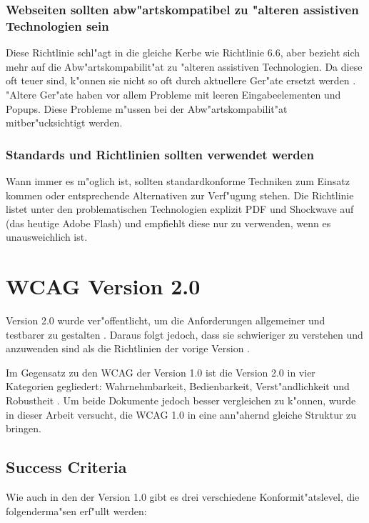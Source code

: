\documentclass[a4paper,bibtotoc,oneside]{scrbook}
\begin{document}
\subsubsection{Webseiten sollten abw"artskompatibel zu "alteren assistiven Technologien sein}
Diese Richtlinie schl"agt in die gleiche Kerbe wie Richtlinie 6.6, aber bezieht sich mehr auf die Abw"artskompabilit"at zu "alteren assistiven Technologien. Da diese oft teuer sind, k"onnen sie nicht so oft durch aktuellere Ger"ate ersetzt werden \cite[S. 48]{barr_webd}. "Altere Ger"ate haben vor allem Probleme mit leeren Eingabeelementen und Popups. Diese Probleme m"ussen bei der Abw"artskompabilit"at mitber"ucksichtigt werden. \cite[Abschnitt 6.10]{wcag1}

\subsubsection{Standards und Richtlinien sollten verwendet werden}
Wann immer es m"oglich ist, sollten standardkonforme Techniken zum Einsatz kommen oder entsprechende Alternativen zur Verf"ugung stehen. Die Richtlinie listet unter den problematischen Technologien explizit PDF und Shockwave auf (das heutige Adobe Flash) und empfiehlt diese nur zu verwenden, wenn es unausweichlich ist. \cite[Abschnitt 6.11]{wcag1}

\section{WCAG Version 2.0}
Version 2.0 wurde ver"offentlicht, um die Anforderungen allgemeiner und testbarer zu gestalten \cite[S. 20]{tool_acc}. Daraus folgt jedoch, dass sie schwieriger zu verstehen und anzuwenden sind als die Richtlinien der vorige Version \cite[S. 24]{mod_software}.

Im Gegensatz zu den WCAG der Version 1.0 ist die Version 2.0 in vier Kategorien gegliedert: Wahrnehmbarkeit, Bedienbarkeit, Verst"andlichkeit und Robustheit \cite[S. 23-24]{mod_software}. Um beide Dokumente jedoch besser vergleichen zu k"onnen, wurde in dieser Arbeit versucht, die WCAG 1.0 in eine ann"ahernd gleiche Struktur zu bringen. 


\subsection{Success Criteria}
Wie auch in den der Version 1.0 gibt es drei verschiedene Konformit"atslevel, die folgenderma"sen erf"ullt werden: \cite[Abschnitt Understanding Requirement 1]{understand_conform}
\end{document}
